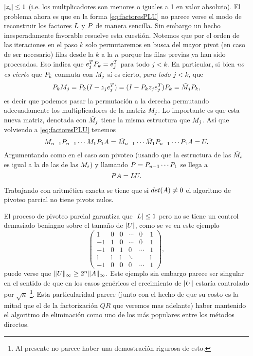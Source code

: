 \begin{tcolorbox}
$|\zb_i|\le 1$ (i.e. los multplicadores son menores o iguales a 1 en valor absoluto).
El problema ahora es que en la forma \eqref{eq:factoresPLU}  no parece verse el modo de reconstruir los factores $\Lb$ y $\Pb$ de manera sencilla. Sin embargo un hecho inesperadamente favorable resuelve esta cuestión. Notemos que por el orden de las iteraciones en el paso $k$ solo permutaremos en busca del mayor pivot (en caso de ser necesario) filas desde la $k$ a la $n$ porque las filas previas ya han sido procesadas. Eso indica que
$\eb_j^T\Pb_k=\eb^T_j$ para todo $j<k$. En particular, si bien \emph{no es cierto} que $\Pb_k$
conmuta con $\Mb_j$ sí es cierto,
\emph{para todo $j<k$}, que
$$
\Pb_k\Mb_j=\Pb_k
(\Ib-\zb_{j}\eb_{j}^T)=
(\Ib-\Pb_k\zb_{j}\eb_{j}^T)\Pb_k=
\tilde\Mb_j \Pb_k,
$$
es decir que podemos pasar la permutación a la derecha permutando adecuadamente los multiplicadores de la matriz $\Mb_j$. Lo importante es que esta nueva matriz, denotada con $\tilde \Mb_j$ tiene la misma estructura que $\Mb_j$. Así que volviendo a  \eqref{eq:factoresPLU} tenemos
$$
\Mb_{n-1}\Pb_{n-1}\cdots \Mb_{1}\Pb_{1}\Ab= \tilde \Mb_{n-1}\cdots \tilde \Mb_{1} \Pb_{n-1}\cdots \Pb_{1}\Ab=\Ub.
$$
Argumentando como en el caso son pivoteo (usando que la estructura de las $\tilde \Mb_i$ es igual a la de las de las $\Mb_i$) y llamando
$\Pb=\Pb_{n-1}\cdots \Pb_{1}$ se llega a
$$
\Pb\Ab=\Lb\Ub.
$$

\begin{tcolorbox}
[colback=black!15!white,colframe=black!75!black] \begin{prop}
  Trabajando con aritmética exacta se tiene que si $det(\Ab)\neq 0$ el algoritmo de pivoteo parcial no tiene pivots nulos.
 \end{prop}
\end{tcolorbox}

\begin{tcolorbox}
[colback=black!15!white,colframe=black!75!black] \begin{rem}
\label{obs:malgauss}
El proceso de pivoteo parcial garantiza que $|\Lb|\le 1$ pero no
se  tiene un control demasiado beningno sobre el tamaño de
$|\Ub|$, como se ve en este ejemplo
$$
\begin{pmatrix}
 1&0&0&\cdots&0&1\\
 -1&1&0&\cdots&0&1\\
 -1&0&1&0&\cdots&1 \\
 \vdots &\vdots&\vdots& \ddots&&\vdots\\
 -1&0&0&0&\cdots&1
\end{pmatrix},
$$
puede verse que $\|\Ub\|_\infty \ge 2^n\|\Ab\|_\infty$.
Este ejemplo sin embargo parece ser singular en el sentido de que en los casos genéricos el crecimiento de $|\Ub|$ estaría controlado por $\sqrt{n}$ \cite{TB} \footnote{Al presente no parece haber una demostración rigurosa de esto.}. Esta particularidad parece (junto con el hecho de que su costo es la mitad que el de la factorización $QR$ que veremos mas adelante) haber mantenido el algoritmo de eliminación como uno de los más populares entre los métodos directos.
 \end{rem}
\end{tcolorbox}


\end{tcolorbox}
